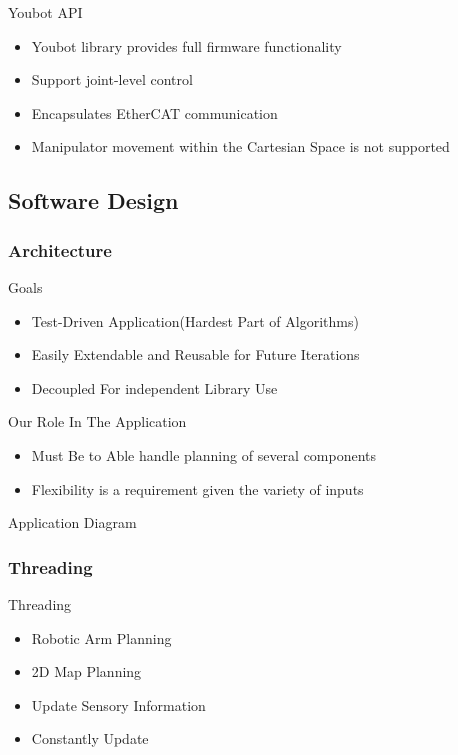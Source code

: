 \documentclass[pdf]{beamer}
\begin{document}
\begin{frame}{Youbot API}
  \begin{itemize}
  \item Youbot library provides full firmware functionality
   \item Support joint-level control
   \item Encapsulates EtherCAT communication
   \item Manipulator movement within the Cartesian Space is not supported
  \end{itemize}
\end{frame}

\subsection{Software Design}

\subsubsection{Architecture}
\begin{frame}{Goals}
  \begin{itemize}
  \item Test-Driven Application(Hardest Part of Algorithms)
  \item Easily Extendable and Reusable for Future Iterations
  \item Decoupled For independent Library Use
  \end{itemize}
\end{frame}

\begin{frame}{Our Role In The Application}
  \begin{itemize}
  \item Must Be to Able handle planning of several components
  \item Flexibility is a requirement given the variety of inputs
  \end{itemize}
\end{frame}

\begin{frame}{Application Diagram}
\end{frame}

\subsubsection{Threading}
\begin{frame}{Threading}
  \begin{itemize}
  \item Robotic Arm Planning
  \item 2D Map Planning
  \item Update Sensory Information
  \item Constantly Update
  \end{itemize}
\end{frame}
\end{document}
